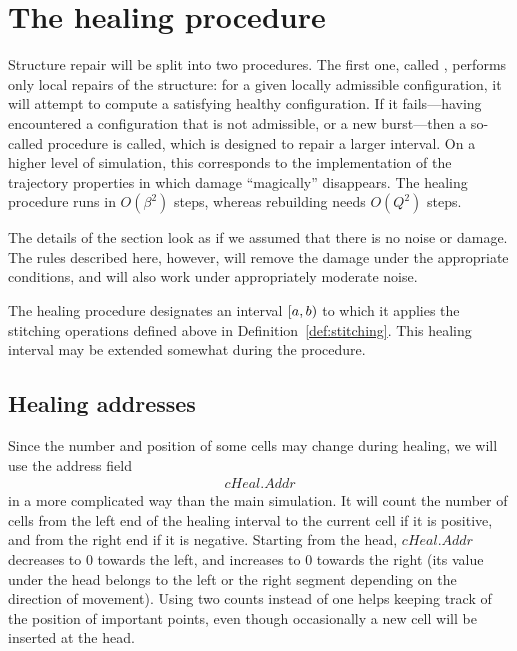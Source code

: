 \documentclass[12pt]{memoir}
\newcommand{\authnote}[3]
{\text{{ \textcolor{#3}{\( \langle\hspace{-0.2em}\langle \)\textsf{\footnotesize #1: #2}\( \rangle\hspace{-0.2em}\rangle \)}}}}
\newcommand{\authnote}[2]{}
\newcommand{\Pnote}[1]{{\authnote{Peter}{#1}{cyan}}}
\newcommand{\fld}[1]{\ensuremath{\textit{#1}}}
\newcommand{\Addr}{\fld{Addr}}
\newcommand{\cHeal}{\fld{cHeal}}
\begin{document}
\section{The healing procedure}\label{sec:healing}

Structure repair will be split into two procedures.
The first one, called , performs
only local repairs of the structure: for a given locally admissible configuration,
it will attempt to compute a satisfying healthy configuration.
If it fails---having encountered a configuration that is not admissible, or
a new burst---then a so-called  procedure is called, which is designed
to repair a larger interval.
On a higher level of simulation, 
this corresponds to the implementation of the trajectory properties
in which damage ``magically'' disappears.
The healing procedure runs in \( O(\beta^{2}) \) 
steps, whereas rebuilding needs \( O(Q^{2}) \) steps. \Pnote{maybe even \( Q^{3} \)?}

The details of the section look as if we assumed that there is no noise or damage.
The rules described here, however, will remove the damage under the 
appropriate conditions, and will also work under appropriately moderate noise.

The healing procedure designates an interval \( [a,b) \)
to which it applies the
stitching operations defined above in Definition~\ref{def:stitching}.
This healing interval may be extended somewhat during the procedure.


\subsection{Healing addresses}\label{sec:rec-addr}

Since the number and position of some cells may change during healing, 
we will use the address field
 \begin{align*}
 \cHeal.\Addr 
 \end{align*}
in a more complicated way than the main simulation.
It will count the number of cells 
from the left end of the healing interval to the current cell if it is positive,
and from the right end if it is negative.
Starting from the head, \( \cHeal.\Addr \) decreases to 0 towards the left, 
and increases to 0 towards the right (its value under the head belongs to
the left or the right segment depending on the direction of movement).
Using two counts instead of one helps keeping track of the position of important points,
even though occasionally a new cell will be inserted at the head.
\end{document}
